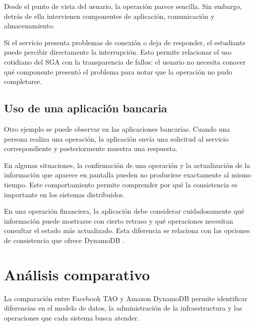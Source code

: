\documentclass[12pt,a4paper]{article}
\begin{document}
Desde el punto de vista del usuario, la operación parece sencilla. Sin embargo, detrás de ella intervienen componentes de aplicación, comunicación y almacenamiento.

Si el servicio presenta problemas de conexión o deja de responder, el estudiante puede percibir directamente la interrupción. Esto permite relacionar el uso cotidiano del SGA con la transparencia de fallos: el usuario no necesita conocer qué componente presentó el problema para notar que la operación no pudo completarse.

\subsection{Uso de una aplicación bancaria}

Otro ejemplo se puede observar en las aplicaciones bancarias. Cuando una persona realiza una operación, la aplicación envía una solicitud al servicio correspondiente y posteriormente muestra una respuesta.

En algunas situaciones, la confirmación de una operación y la actualización de la información que aparece en pantalla pueden no producirse exactamente al mismo tiempo. Este comportamiento permite comprender por qué la consistencia es importante en los sistemas distribuidos.

En una operación financiera, la aplicación debe considerar cuidadosamente qué información puede mostrarse con cierto retraso y qué operaciones necesitan consultar el estado más actualizado. Esta diferencia se relaciona con las opciones de consistencia que ofrece DynamoDB \cite{awsdynamodbconsistency}.

\section{Análisis comparativo}

La comparación entre Facebook TAO y Amazon DynamoDB permite identificar diferencias en el modelo de datos, la administración de la infraestructura y las operaciones que cada sistema busca atender.
\end{document}
